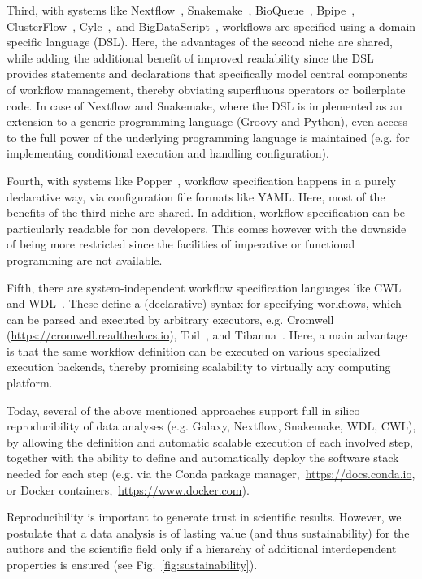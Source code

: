 \documentclass[parskip=half]{scrartcl}
\let\plainurl\url
\renewcommand{\url}[1]{\protect\plainurl{#1}}
\begin{document}
Third, with systems like Nextflow~\parencite{Di_Tommaso_2017}, Snakemake~\parencite{Köster2012}, BioQueue~\parencite{Yao2017}, Bpipe~\parencite{Sadedin2012}, ClusterFlow~\parencite{Ewels2016}, Cylc~\parencite{J_Oliver_2018},~and BigDataScript~\parencite{Cingolani_2014}, workflows are specified using a domain specific language (DSL).
Here, the advantages of the second niche are shared, while adding the additional benefit of improved readability since the DSL provides statements and declarations that specifically model central components of workflow management, thereby obviating superfluous operators or boilerplate code.
In case of Nextflow and Snakemake, where the DSL is implemented as an extension to a generic programming language (Groovy and Python), even access to the full power of the underlying programming language is maintained (e.g. for implementing conditional execution and handling configuration).

Fourth, with systems like Popper~\parencite{Jimenez_2017}, workflow specification happens in a purely declarative way, via configuration file formats like YAML.
Here, most of the benefits of the third niche are shared.
In addition, workflow specification can be particularly readable for non developers.
This comes however with the downside of being more restricted since the facilities of imperative or functional programming are not available.

Fifth, there are system-independent workflow specification languages like CWL~\parencite{cwl} and WDL~\parencite{voss_full-stack_2017}.
These define a (declarative) syntax for specifying workflows, which can be parsed and executed by arbitrary executors, e.g. Cromwell (\url{https://cromwell.readthedocs.io}), Toil~\parencite{Vivian_2017}, and Tibanna~\parencite{Lee_2019}.
Here, a main advantage is that the same workflow definition can be executed on various specialized execution backends, thereby promising scalability to virtually any computing platform.

Today, several of the above mentioned approaches support full in silico reproducibility of data analyses (e.g. Galaxy, Nextflow, Snakemake, WDL, CWL), by allowing the definition and automatic scalable execution of each involved step, together with the ability to define and automatically deploy the software stack needed for each step (e.g. via the Conda package manager,~\url{https://docs.conda.io}, or Docker containers,~\url{https://www.docker.com}).

Reproducibility is important to generate trust in scientific results.
However, we postulate that a data analysis is of lasting value (and thus sustainability) for the authors and the scientific field only if a hierarchy of additional interdependent properties is ensured (see Fig.~\ref{fig:sustainability}).
\end{document}
